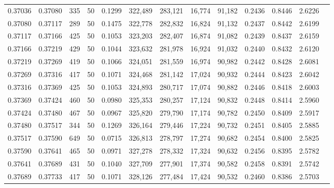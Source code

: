 \begin{tabular}{rrrrrrrrrrrrr}
0.37036 & 0.37080 &   335 &  50 &                                     0.1299 & 322,489 & 283,121 &  16,774 &  91,182 & 0.2436 & 0.8446 & 2.6226 \\
0.37080 & 0.37117 &   289 &  50 &                                     0.1475 & 322,778 & 282,832 &  16,824 &  91,132 & 0.2437 & 0.8442 & 2.6199 \\
0.37117 & 0.37166 &   425 &  50 &                                     0.1053 & 323,203 & 282,407 &  16,874 &  91,082 & 0.2439 & 0.8437 & 2.6159 \\
0.37166 & 0.37219 &   429 &  50 &                                     0.1044 & 323,632 & 281,978 &  16,924 &  91,032 & 0.2440 & 0.8432 & 2.6120 \\
0.37219 & 0.37269 &   419 &  50 &                                     0.1066 & 324,051 & 281,559 &  16,974 &  90,982 & 0.2442 & 0.8428 & 2.6081 \\
0.37269 & 0.37316 &   417 &  50 &                                     0.1071 & 324,468 & 281,142 &  17,024 &  90,932 & 0.2444 & 0.8423 & 2.6042 \\
0.37316 & 0.37369 &   425 &  50 &                                     0.1053 & 324,893 & 280,717 &  17,074 &  90,882 & 0.2446 & 0.8418 & 2.6003 \\
0.37369 & 0.37424 &   460 &  50 &                                     0.0980 & 325,353 & 280,257 &  17,124 &  90,832 & 0.2448 & 0.8414 & 2.5960 \\
0.37424 & 0.37480 &   467 &  50 &                                     0.0967 & 325,820 & 279,790 &  17,174 &  90,782 & 0.2450 & 0.8409 & 2.5917 \\
0.37480 & 0.37517 &   344 &  50 &                                     0.1269 & 326,164 & 279,446 &  17,224 &  90,732 & 0.2451 & 0.8405 & 2.5885 \\
0.37517 & 0.37590 &   649 &  50 &                                     0.0715 & 326,813 & 278,797 &  17,274 &  90,682 & 0.2454 & 0.8400 & 2.5825 \\
0.37590 & 0.37641 &   465 &  50 &                                     0.0971 & 327,278 & 278,332 &  17,324 &  90,632 & 0.2456 & 0.8395 & 2.5782 \\
0.37641 & 0.37689 &   431 &  50 &                                     0.1040 & 327,709 & 277,901 &  17,374 &  90,582 & 0.2458 & 0.8391 & 2.5742 \\
0.37689 & 0.37733 &   417 &  50 &                                     0.1071 & 328,126 & 277,484 &  17,424 &  90,532 & 0.2460 & 0.8386 & 2.5703 \\

\end{tabular}
